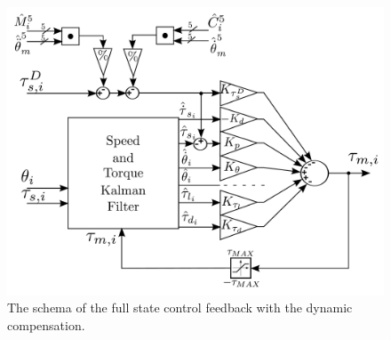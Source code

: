 \documentclass[journal]{IEEEtran}
\newcommand{\hl}[1]{\colorbox{yellow}{#1}}
\newcommand{\vects}[1]{{\boldsymbol {#1}}}
\begin{document}
	\begin{figure}[]
		\centering
		\includegraphics[width=1.0\columnwidth]{FullStateControlFeedback.pdf}
		\caption{The schema of the full state control feedback with the dynamic compensation.}
		\label{fig:full state}
	\end{figure}
	
\end{document}
